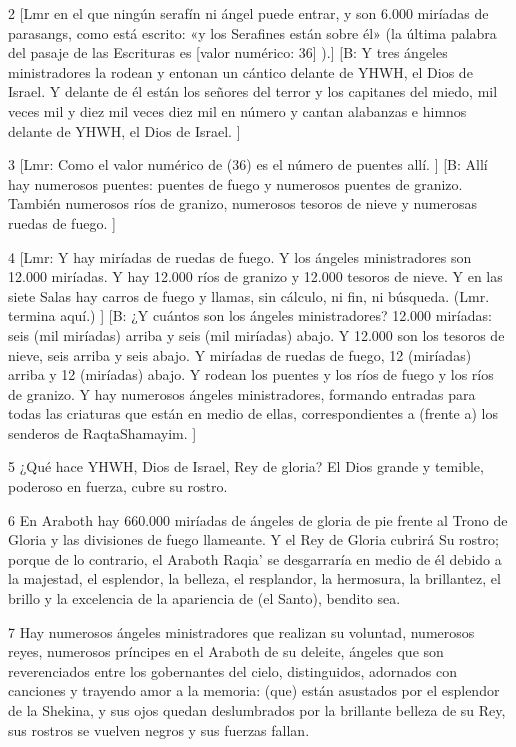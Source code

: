 \par 2 [Lmr en el que ningún serafín ni ángel puede entrar, y son 6.000 miríadas de parasangs, como está escrito: «y los Serafines están sobre él» (la última palabra del pasaje de las Escrituras es [valor numérico: 36] ).] [B: Y tres ángeles ministradores la rodean y entonan un cántico delante de YHWH, el Dios de Israel. Y delante de él están los señores del terror y los capitanes del miedo, mil veces mil y diez mil veces diez mil en número y cantan alabanzas e himnos delante de YHWH, el Dios de Israel. ]

\par 3 [Lmr: Como el valor numérico de (36) es el número de puentes allí. ] [B: Allí hay numerosos puentes: puentes de fuego y numerosos puentes de granizo. También numerosos ríos de granizo, numerosos tesoros de nieve y numerosas ruedas de fuego. ]

\par 4 [Lmr: Y hay miríadas de ruedas de fuego. Y los ángeles ministradores son 12.000 miríadas. Y hay 12.000 ríos de granizo y 12.000 tesoros de nieve. Y en las siete Salas hay carros de fuego y llamas, sin cálculo, ni fin, ni búsqueda. (Lmr. termina aquí.) ] [B: ¿Y cuántos son los ángeles ministradores? 12.000 miríadas: seis (mil miríadas) arriba y seis (mil miríadas) abajo. Y 12.000 son los tesoros de nieve, seis arriba y seis abajo. Y miríadas de ruedas de fuego, 12 (miríadas) arriba y 12 (miríadas) abajo. Y rodean los puentes y los ríos de fuego y los ríos de granizo. Y hay numerosos ángeles ministradores, formando entradas para todas las criaturas que están en medio de ellas, correspondientes a (frente a) los senderos de RaqtaShamayim. ]

\par 5 ¿Qué hace YHWH, Dios de Israel, Rey de gloria? El Dios grande y temible, poderoso en fuerza, cubre su rostro.

\par 6 En Araboth hay 660.000 miríadas de ángeles de gloria de pie frente al Trono de Gloria y las divisiones de fuego llameante. Y el Rey de Gloria cubrirá Su rostro; porque de lo contrario, el Araboth Raqia' se desgarraría en medio de él debido a la majestad, el esplendor, la belleza, el resplandor, la hermosura, la brillantez, el brillo y la excelencia de la apariencia de (el Santo), bendito sea.

\par 7 Hay numerosos ángeles ministradores que realizan su voluntad, numerosos reyes, numerosos príncipes en el Araboth de su deleite, ángeles que son reverenciados entre los gobernantes del cielo, distinguidos, adornados con canciones y trayendo amor a la memoria: (que) están asustados por el esplendor de la Shekina, y sus ojos quedan deslumbrados por la brillante belleza de su Rey, sus rostros se vuelven negros y sus fuerzas fallan.

